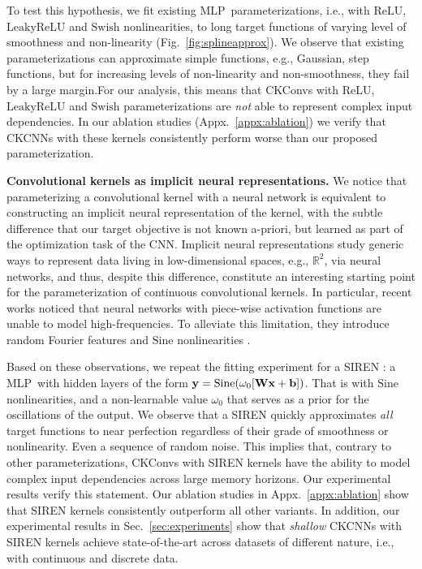 \documentclass{article}
\def\sR{{\mathbb{R}}}
\newcommand{\mat}[1]{\ensuremath{{\mathbf{\MakeUppercase{{#1}}}}}}
\renewcommand{\vec}[1]{\ensuremath{\mathbf{\MakeLowercase{{#1}}}}}
\newcommand{\Wm}{\mat{W}}
\newcommand{\xv}{\vec{x}}
\newcommand{\yv}{\vec{y}}
\newcommand{\bv}{\vec{b}}
\def\sR{{\mathbb{R}}}
\newcommand{\mlp}{{\btt MLP}}
\begin{document}
To test this hypothesis, we fit existing \mlp\ parameterizations, i.e., with $\mathrm{ReLU}$, $\mathrm{LeakyReLU}$ and $\mathrm{Swish}$ nonlinearities, to long target functions of varying level of smoothness and non-linearity (Fig.~\ref{fig:splineapprox}).
We observe that existing parameterizations can approximate simple functions, e.g., Gaussian, step functions, but for increasing levels of non-linearity and non-smoothness, they fail by a large margin.\break For our analysis, this means that CKConvs with $\mathrm{ReLU}$, $\mathrm{LeakyReLU}$ and $\mathrm{Swish}$ parameterizations are \textit{not} able to represent complex input dependencies. In our ablation studies (Appx.~\ref{appx:ablation}) we verify that CKCNNs with these kernels consistently perform worse than our proposed parameterization.

\textbf{Convolutional kernels as implicit neural representations.} We notice that parameterizing a convolutional kernel with a neural network is equivalent to constructing an implicit neural representation of the kernel, with the subtle difference that our target objective is not known a-priori, but learned as part of the optimization task of the CNN. Implicit neural representations study generic ways to represent data living in low-dimensional spaces, e.g., $\sR^{2}$, via neural networks, and thus, despite this difference, constitute an interesting starting point for the parameterization of continuous convolutional kernels.\break
In particular, recent works noticed that neural networks with piece-wise activation functions are unable to model high-frequencies. To alleviate this limitation, they introduce random Fourier features \citep{tancik2020fourier} and $\mathrm{Sine}$ nonlinearities \citep{sitzmann2020implicit}.

Based on these observations, we repeat the fitting experiment for a SIREN \citep{sitzmann2020implicit}: a \mlp\ with hidden layers of the form $\yv=\mathrm{Sine}(\omega_0 [\Wm\xv + \bv])$.  That is with $\mathrm{Sine}$ nonlinearities, and a non-learnable value $\omega_0$ that serves as a prior for the oscillations of the output. 
We observe that a SIREN quickly approximates \textit{all} target functions to near perfection regardless of their grade of smoothness or nonlinearity. Even a sequence of random noise. This implies that, contrary to other parameterizations, CKConvs with SIREN kernels have the ability to model complex input dependencies across large memory horizons. Our experimental results verify this statement. Our ablation studies in Appx.~\ref{appx:ablation} show that SIREN kernels consistently outperform all other variants. In addition, our experimental results in Sec.~\ref{sec:experiments} show that \textit{shallow} CKCNNs with SIREN kernels achieve state-of-the-art across datasets of different nature, i.e., with continuous and discrete data.
\end{document}
